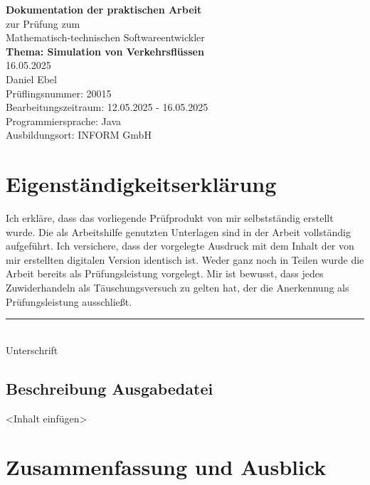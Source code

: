 \documentclass[a4paper,12pt]{report}
\begin{document}
\begin{titlepage}
    \centering
    \vspace*{3cm}
    {\Huge \textbf{Dokumentation der praktischen Arbeit}}\\[2cm]
    {\large zur Prüfung zum \\ Mathematisch-technischen Softwareentwickler}\\[2cm]
    {\Large \textbf{Thema: Simulation von Verkehrsflüssen}}\\[1cm]
    {16.05.2025}\\[5cm]
    {Daniel Ebel}\\[2cm]
    Prüflingsnummer: 20015\\[0.5cm]
    Bearbeitungszeitraum: 12.05.2025 - 16.05.2025\\[0.5cm]
    Programmiersprache: Java\\[0.5cm]
    Ausbildungsort: INFORM GmbH
\end{titlepage}

\chapter*{Eigenständigkeitserklärung}
Ich erkläre, dass das vorliegende Prüfprodukt von mir selbstständig erstellt wurde.
Die als Arbeitshilfe genutzten Unterlagen sind in der Arbeit vollständig aufgeführt.
Ich versichere, dass der vorgelegte Ausdruck mit dem Inhalt der von mir erstellten digitalen Version identisch ist.
Weder ganz noch in Teilen wurde die Arbeit bereits als Prüfungsleistung vorgelegt.
Mir ist bewusst, dass jedes Zuwiderhandeln als Täuschungsversuch zu gelten hat, der die Anerkennung als Prüfungsleistung ausschließt.

\vspace{2cm}

\noindent\rule{7cm}{0.4pt}\\
Unterschrift

\tableofcontents







\section{Beschreibung Ausgabedatei}
<Inhalt einfügen>



\chapter{Zusammenfassung und Ausblick}
\end{document}
